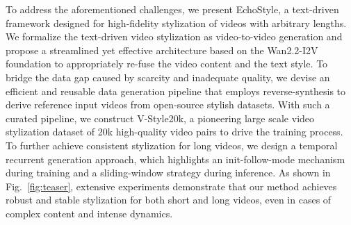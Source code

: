 \documentclass[runningheads]{llncs}
\begin{document}
To address the aforementioned challenges, we present EchoStyle, a text-driven framework designed for high-fidelity stylization of videos with arbitrary lengths. We formalize the text-driven video stylization as video-to-video generation and propose a streamlined yet effective architecture based on the Wan2.2-I2V~\cite{wan2025wan} foundation to appropriately re-fuse the video content and the text style. To bridge the data gap caused by scarcity and inadequate quality, we devise an efficient and reusable data generation pipeline that employs reverse-synthesis to derive reference input videos from open-source stylish datasets. With such a curated pipeline, we construct V-Style20k, a pioneering large scale video stylization dataset of 20k high-quality video pairs to drive the training process. To further achieve consistent stylization for long videos, we design a temporal recurrent generation approach, which highlights an init-follow-mode mechanism during training and a sliding-window strategy during inference. As shown in Fig.~\ref{fig:teaser}, extensive experiments demonstrate that our method achieves robust and stable stylization for both short and long videos, even in cases of complex content and intense dynamics.
\end{document}
